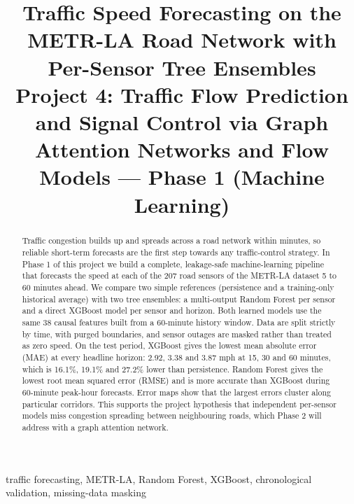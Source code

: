 \documentclass[conference]{IEEEtran}
\begin{document}
\title{Traffic Speed Forecasting on the METR-LA Road Network with Per-Sensor Tree Ensembles\\
\large Project 4: Traffic Flow Prediction and Signal Control via Graph Attention Networks and Flow Models --- Phase 1 (Machine Learning)}

\author{
}

\maketitle

\begin{abstract}
Traffic congestion builds up and spreads across a road network within minutes, so reliable short-term forecasts are the first step towards any traffic-control strategy. In Phase 1 of this project we build a complete, leakage-safe machine-learning pipeline that forecasts the speed at each of the 207 road sensors of the METR-LA dataset 5 to 60 minutes ahead. We compare two simple references (persistence and a training-only historical average) with two tree ensembles: a multi-output Random Forest per sensor and a direct XGBoost model per sensor and horizon. Both learned models use the same 38 causal features built from a 60-minute history window. Data are split strictly by time, with purged boundaries, and sensor outages are masked rather than treated as zero speed. On the test period, XGBoost gives the lowest mean absolute error (MAE) at every headline horizon: 2.92, 3.38 and 3.87 mph at 15, 30 and 60 minutes, which is 16.1\%, 19.1\% and 27.2\% lower than persistence. Random Forest gives the lowest root mean squared error (RMSE) and is more accurate than XGBoost during 60-minute peak-hour forecasts. Error maps show that the largest errors cluster along particular corridors. This supports the project hypothesis that independent per-sensor models miss congestion spreading between neighbouring roads, which Phase 2 will address with a graph attention network.
\end{abstract}

\begin{IEEEkeywords}
traffic forecasting, METR-LA, Random Forest, XGBoost, chronological validation, missing-data masking
\end{IEEEkeywords}
\end{document}
